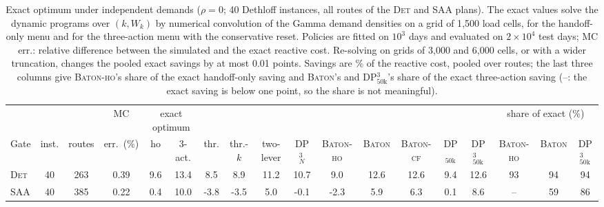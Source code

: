 \begin{table}[t]
\caption{Exact optimum under independent demands ($\rho = 0$; 40 Dethloff
instances, all routes of the \textsc{Det} and \textsc{SAA} plans).
The exact values solve the dynamic programs over $(k, W_k)$ by numerical
convolution of the Gamma demand densities on a grid of 1{,}500 load
cells, for the handoff-only menu and for the three-action menu with the
conservative reset. Policies are fitted on $10^3$ days and evaluated on
$2\times10^4$ test days; MC err.: relative difference between the
simulated and the exact reactive cost. Re-solving on grids of 3{,}000
and 6{,}000 cells, or with a wider truncation, changes the pooled exact
savings by at most 0.01 points. Savings are
\% of the reactive cost, pooled over routes; the last three columns give
\textsc{Baton-ho}'s share of the exact handoff-only saving and
\textsc{Baton}'s and DP$^3_{50\mathrm{k}}$'s share of the exact
three-action saving (--: the exact saving is below one point, so the
share is not meaningful).}
\label{tab:exact}
\centering
\scriptsize
\setlength{\tabcolsep}{2.2pt}
\begin{adjustbox}{max width=\linewidth}
\begin{tabular}{l cc c cc ccccccccc ccc}
\toprule
& & & MC & \multicolumn{2}{c}{exact optimum} & & & & & & & & & & \multicolumn{3}{c}{share of exact (\%)} \\ \cmidrule(lr){5-6}\cmidrule(lr){16-18}
Gate & inst. & routes & err.\ (\%) & ho & 3-act. & thr. & thr.-$k$ & two-lever & DP$^3_N$ & \textsc{Baton-ho} & \textsc{Baton} & \textsc{Baton-cf} & DP$_{50\mathrm{k}}$ & DP$^3_{50\mathrm{k}}$ & \textsc{Baton-ho} & \textsc{Baton} & DP$^3_{50\mathrm{k}}$ \\
\midrule
\textsc{Det} & 40 & 263 & 0.39 & 9.6 & 13.4 & 8.5 & 8.9 & 11.2 & 10.7 & 9.0 & 12.6 & 12.6 & 9.4 & 12.6 & 93 & 94 & 94 \\
\textsc{SAA} & 40 & 385 & 0.22 & 0.4 & 10.0 & -3.8 & -3.5 & 5.0 & -0.1 & -2.3 & 5.9 & 6.3 & 0.1 & 8.6 & -- & 59 & 86 \\
\bottomrule
\end{tabular}
\end{adjustbox}
\end{table}
